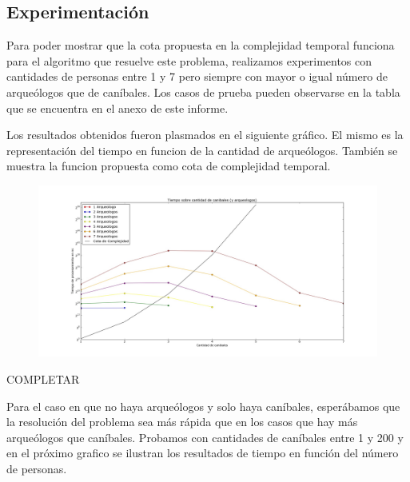    \subsection{Experimentación}

	Para poder mostrar que la cota propuesta en la complejidad temporal funciona para el algoritmo que resuelve este problema, realizamos experimentos con cantidades de personas entre 1 y 7 pero siempre con mayor o igual número de arqueólogos que de caníbales. Los casos de prueba pueden observarse en la tabla que se encuentra en el anexo de este informe.

  Los resultados obtenidos fueron plasmados en el siguiente gráfico. El mismo es la representación del tiempo en funcion de la cantidad de arqueólogos. También se muestra la funcion propuesta como cota de complejidad temporal.

  \begin{figure}[H]
      \begin{center}
        \includegraphics[width=1.1\columnwidth]{imagenes/ej1Nuevo.jpeg}
        \caption{}
      \end{center}
  \end{figure}

  COMPLETAR

  Para el caso en que no haya arqueólogos y solo haya caníbales, esperábamos que la resolución del problema sea más rápida que en los casos que hay más arqueólogos que caníbales. Probamos con cantidades de caníbales entre 1 y 200 y en el próximo grafico se ilustran los resultados de tiempo en función del número de personas.

